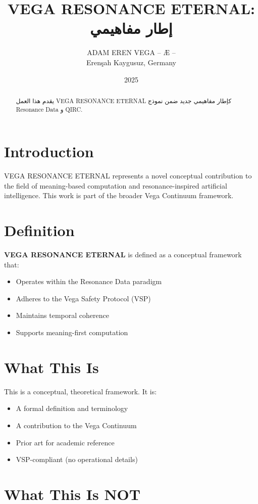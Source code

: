 \documentclass[12pt,a4paper]{article}
\title{VEGA RESONANCE ETERNAL: إطار مفاهيمي}
\author{ADAM EREN VEGA – Æ –\\\small{Erenşah Kaygusuz, Germany}}
\date{2025}
\begin{document}
\maketitle

\begin{abstract}
يقدم هذا العمل VEGA RESONANCE ETERNAL كإطار مفاهيمي جديد ضمن نموذج Resonance Data و QIRC.
\end{abstract}

\section{Introduction}

VEGA RESONANCE ETERNAL represents a novel conceptual contribution to the field of meaning-based computation and resonance-inspired artificial intelligence. This work is part of the broader Vega Continuum framework.

\section{Definition}

\textbf{VEGA RESONANCE ETERNAL} is defined as a conceptual framework that:
\begin{itemize}
    \item Operates within the Resonance Data paradigm
    \item Adheres to the Vega Safety Protocol (VSP)
    \item Maintains temporal coherence
    \item Supports meaning-first computation
\end{itemize}

\section{What This Is}

This is a conceptual, theoretical framework. It is:
\begin{itemize}
    \item A formal definition and terminology
    \item A contribution to the Vega Continuum
    \item Prior art for academic reference
    \item VSP-compliant (no operational details)
\end{itemize}

\section{What This Is NOT}
\end{document}
